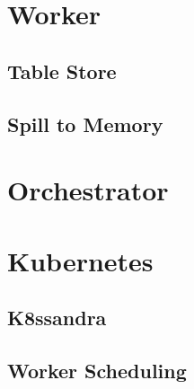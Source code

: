 \section{Worker}

\subsection{Table Store}

\subsection{Spill to Memory}

\section{Orchestrator}

\section{Kubernetes}
\subsection{K8ssandra}

\subsection{Worker Scheduling}


